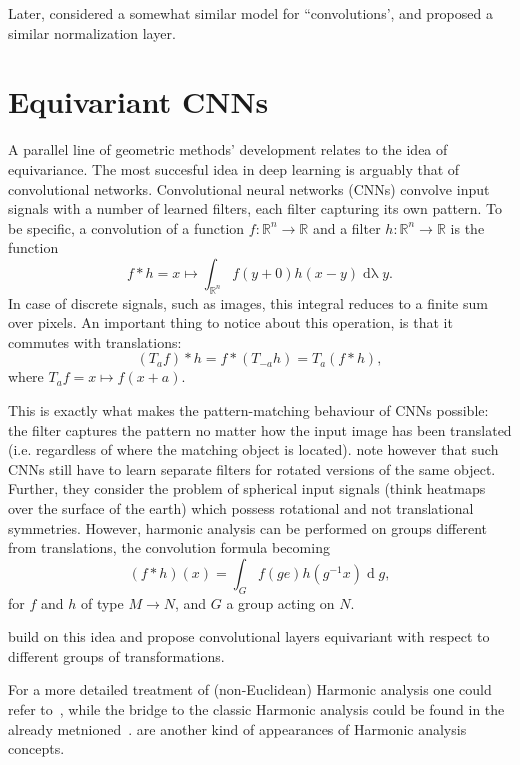 Later, \citet{bouza2020mvc} considered a somewhat similar model for
``convolutions', and \citet{chakraborty2020manifoldnorm} proposed a similar
normalization layer.

\section{Equivariant CNNs} \label{sec:equivariant}

A parallel line of geometric methods' development relates to the idea of
equivariance. The most succesful idea in deep learning is arguably that of
convolutional networks. Convolutional neural networks (CNNs) convolve
input signals with a number of learned filters, each filter capturing
its own pattern. To be specific, a convolution of a function \( f: \mathbb{R}^n
\to \mathbb{R} \) and a filter \( h: \mathbb{R}^n \to \mathbb{R} \) is the
function~\cite{feichtingerFAHA}
\[ f*h = x \mapsto \int_{\mathbb{R}^n} f(y + 0) h(x-y)
\operatorname{d\lambda} y. \]
In case of discrete signals, such as images, this
integral reduces to a finite sum over pixels. An important thing to notice
about this operation, is that it commutes with translations:
\[ (T_a f) * h = f * (T_{-a} h) = T_a (f * h), \]
where \( T_a f = x \mapsto f(x + a) \).

This is exactly what makes the pattern-matching behaviour of CNNs possible: the
filter captures the pattern no matter how the input image has been translated
(i.e. regardless of where the matching object is located). \citet{s2cnn} note
however that such CNNs still have to learn separate filters for rotated
versions of the same object. Further, they consider the problem of spherical
input signals (think heatmaps over the surface of the earth) which possess
rotational and not translational symmetries. However, harmonic analysis can be
performed on groups different from translations, the convolution
formula becoming
\[
(f * h)(x) = \int_G f(g e) h(g^{-1}x) \operatorname{d}g,
\]
for \( f \) and \( h \) of type \( M\to N \), and \( G \) a group acting on
\( N \).

\citet{s2cnn,cohen2018general,e2cnn} build on this idea and propose
convolutional layers equivariant with respect to different groups of
transformations.

For a more detailed treatment of (non-Euclidean) Harmonic analysis one could
refer
to~\citet{axlerHarmonic,
elliott2019generalized,
explorationsHarmonic,
benedettoHarmonic,
stollharmonic,
terrasHarmonicSymmetric,
terrasHarmonicSymmetric2,
fourierS2},
while the bridge to the classic Harmonic analysis could be found in the already
metnioned~\cite{feichtingerFAHA}.
\citet{eyeRotations,zhou2019glosh,scnnNiessner} are another kind of appearances
of Harmonic analysis concepts.

